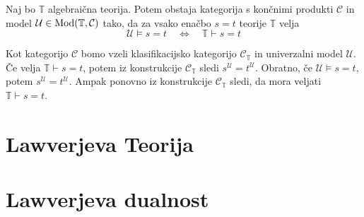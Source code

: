 \begin{izrek}
Naj bo $\mathbb{T}$ algebraična teorija. Potem obstaja kategorija s končnimi produkti $\mathcal{C}$ in model $\mathcal{U} \in \operatorname{Mod}(\mathbb{T}, \mathcal{C})$ tako, da za vsako enačbo $s = t$ teorije $\mathbb{T}$ velja
$$\mathcal{U} \models s = t \quad \Longleftrightarrow \quad \mathbb{T} \vdash s = t$$
\end{izrek}
\begin{dokaz}
Kot kategorijo $\mathcal{C}$ bomo vzeli klasifikacijsko kategorijo $\mathcal{C}_\mathbb{T}$ in univerzalni model $\mathcal{U}$. Če velja $\mathbb{T} \vdash s = t$, potem iz konstrukcije $\mathcal{C}_\mathbb{T}$ sledi $s^\mathcal{U} = t^\mathcal{U}$. Obratno, če $\mathcal{U} \models s = t$, potem $s^\mathcal{U} = t^\mathcal{U}$. Ampak ponovno iz konstrukcije $\mathcal{C}_\mathbb{T}$ sledi, da mora veljati $\mathbb{T} \vdash s = t$.
\end{dokaz}
%
%
\section{Lawverjeva Teorija}
%
\section{Lawverjeva dualnost}